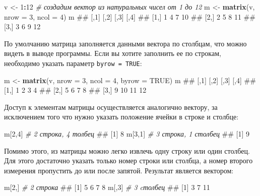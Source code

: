 \documentclass[]{book}
\newenvironment{Shaded}{\begin{snugshade}}{\end{snugshade}}
\newcommand{\KeywordTok}[1]{\textcolor[rgb]{0.13,0.29,0.53}{\textbf{#1}}}
\newcommand{\DataTypeTok}[1]{\textcolor[rgb]{0.13,0.29,0.53}{#1}}
\newcommand{\DecValTok}[1]{\textcolor[rgb]{0.00,0.00,0.81}{#1}}
\newcommand{\StringTok}[1]{\textcolor[rgb]{0.31,0.60,0.02}{#1}}
\newcommand{\CommentTok}[1]{\textcolor[rgb]{0.56,0.35,0.01}{\textit{#1}}}
\newcommand{\OtherTok}[1]{\textcolor[rgb]{0.56,0.35,0.01}{#1}}
\newcommand{\OperatorTok}[1]{\textcolor[rgb]{0.81,0.36,0.00}{\textbf{#1}}}
\newcommand{\NormalTok}[1]{#1}
\begin{document}
\begin{Shaded}
\begin{Highlighting}[]
\NormalTok{v <-}\StringTok{ }\DecValTok{1}\OperatorTok{:}\DecValTok{12}  \CommentTok{# создадим вектор из натуральных чисел от 1 до 12}
\NormalTok{m <-}\StringTok{ }\KeywordTok{matrix}\NormalTok{(v, }\DataTypeTok{nrow =} \DecValTok{3}\NormalTok{, }\DataTypeTok{ncol =} \DecValTok{4}\NormalTok{)}
\NormalTok{m}
\NormalTok{##      [,1] [,2] [,3] [,4]}
\NormalTok{## [1,]    1    4    7   10}
\NormalTok{## [2,]    2    5    8   11}
\NormalTok{## [3,]    3    6    9   12}
\end{Highlighting}
\end{Shaded}

По умолчанию матрица заполняется данными вектора по столбцам, что можно
видеть в выводе программы. Если вы хотите заполнить ее по строкам,
необходимо указать параметр \texttt{byrow\ =\ TRUE}:

\begin{Shaded}
\begin{Highlighting}[]
\NormalTok{m <-}\StringTok{ }\KeywordTok{matrix}\NormalTok{(v, }\DataTypeTok{nrow =} \DecValTok{3}\NormalTok{, }\DataTypeTok{ncol =} \DecValTok{4}\NormalTok{, }\DataTypeTok{byrow =} \OtherTok{TRUE}\NormalTok{)}
\NormalTok{m}
\NormalTok{##      [,1] [,2] [,3] [,4]}
\NormalTok{## [1,]    1    2    3    4}
\NormalTok{## [2,]    5    6    7    8}
\NormalTok{## [3,]    9   10   11   12}
\end{Highlighting}
\end{Shaded}

Доступ к элементам матрицы осуществляется аналогично вектору, за
исключением того что нужно указать положение ячейки в строке и столбце:

\begin{Shaded}
\begin{Highlighting}[]
\NormalTok{m[}\DecValTok{2}\NormalTok{,}\DecValTok{4}\NormalTok{]  }\CommentTok{# 2 строка, 4 толбец}
\NormalTok{## [1] 8}
\NormalTok{m[}\DecValTok{3}\NormalTok{,}\DecValTok{1}\NormalTok{]  }\CommentTok{# 3 строка, 1 столбец}
\NormalTok{## [1] 9}
\end{Highlighting}
\end{Shaded}

Помимо этого, из матрицы можно легко извлечь одну строку или один
столбец. Для этого достаточно указать только номер строки или столбца, а
номер второго измерения пропустить до или после запятой. Результат
является вектором:

\begin{Shaded}
\begin{Highlighting}[]
\NormalTok{m[}\DecValTok{2}\NormalTok{,]  }\CommentTok{# 2 строка}
\NormalTok{## [1] 5 6 7 8}
\NormalTok{m[,}\DecValTok{3}\NormalTok{]  }\CommentTok{# 3 cтолбец}
\NormalTok{## [1]  3  7 11}
\end{Highlighting}
\end{Shaded}
\end{document}
